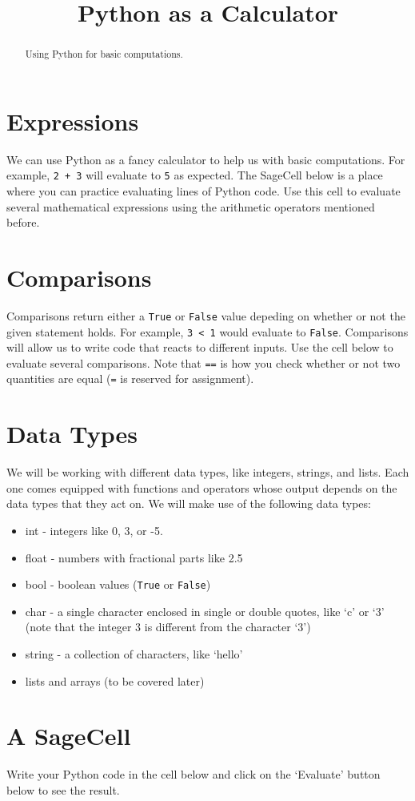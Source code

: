 \documentclass{ximera}
\title{Python as a Calculator}
\begin{document}
  
\begin{abstract}  
Using Python for basic computations.
\end{abstract}  
\maketitle

\section{Expressions}

We can use Python as a fancy calculator to help us with basic computations. For example, \verb|2 + 3| will evaluate to \verb|5| as expected. The SageCell below is a place where you can practice evaluating lines of Python code. Use this cell to evaluate several mathematical expressions using the arithmetic operators mentioned before.

\section{Comparisons}

Comparisons return either a \verb|True| or \verb|False| value depeding on whether or not the given statement holds. For example, \verb|3 < 1| would evaluate to \verb|False|. Comparisons will allow us to write code that reacts to different inputs. Use the cell below to evaluate several comparisons. Note that \verb|==| is how you check whether or not two quantities are equal (\verb|=| is reserved for assignment).

\section{Data Types}

We will be working with different data types, like integers, strings, and lists. Each one comes equipped with functions and operators whose output depends on the data types that they act on. We will make use of the following data types:

\begin{itemize}
	\item int - integers like 0, 3, or -5.
	\item float - numbers with fractional parts like 2.5
	\item bool - boolean values (\verb|True| or \verb|False|)
	\item char - a single character enclosed in single or double quotes, like `c' or `3' (note that the integer 3 is different from the character `3')
	\item string - a collection of characters, like `hello'
	\item lists and arrays (to be covered later)
\end{itemize}

\section{A SageCell}

Write your Python code in the cell below and click on the `Evaluate' button below to see the result.

\begin{sageCell}

\end{sageCell}
\end{document}
